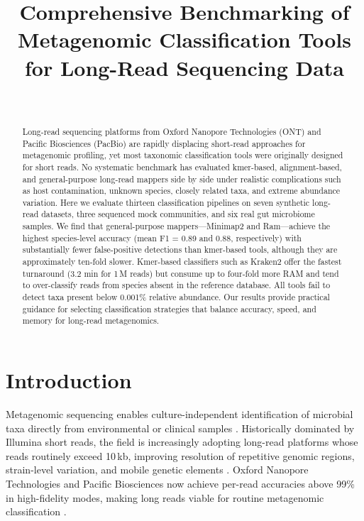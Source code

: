 \documentclass[12pt]{article}
\title{Comprehensive Benchmarking of Metagenomic Classification Tools for Long-Read Sequencing Data}
\author{~}
\date{}
\begin{document}
\maketitle

\begin{abstract}
Long-read sequencing platforms from Oxford Nanopore Technologies (ONT) and Pacific Biosciences (PacBio) are rapidly displacing short-read approaches for metagenomic profiling, yet most taxonomic classification tools were originally designed for short reads. No systematic benchmark has evaluated kmer-based, alignment-based, and general-purpose long-read mappers side by side under realistic complications such as host contamination, unknown species, closely related taxa, and extreme abundance variation. Here we evaluate thirteen classification pipelines on seven synthetic long-read datasets, three sequenced mock communities, and six real gut microbiome samples. We find that general-purpose mappers---Minimap2 and Ram---achieve the highest species-level accuracy (mean F1 = 0.89 and 0.88, respectively) with substantially fewer false-positive detections than kmer-based tools, although they are approximately ten-fold slower. Kmer-based classifiers such as Kraken2 offer the fastest turnaround (3.2 min for 1\,M reads) but consume up to four-fold more RAM and tend to over-classify reads from species absent in the reference database. All tools fail to detect taxa present below 0.001\% relative abundance. Our results provide practical guidance for selecting classification strategies that balance accuracy, speed, and memory for long-read metagenomics.
\end{abstract}

\section{Introduction}

Metagenomic sequencing enables culture-independent identification of microbial taxa directly from environmental or clinical samples \citep{quince2017shotgun}. Historically dominated by Illumina short reads, the field is increasingly adopting long-read platforms whose reads routinely exceed 10\,kb, improving resolution of repetitive genomic regions, strain-level variation, and mobile genetic elements \citep{logsdon2020long}. Oxford Nanopore Technologies and Pacific Biosciences now achieve per-read accuracies above 99\% in high-fidelity modes, making long reads viable for routine metagenomic classification \citep{wenger2019accurate}.
\end{document}
